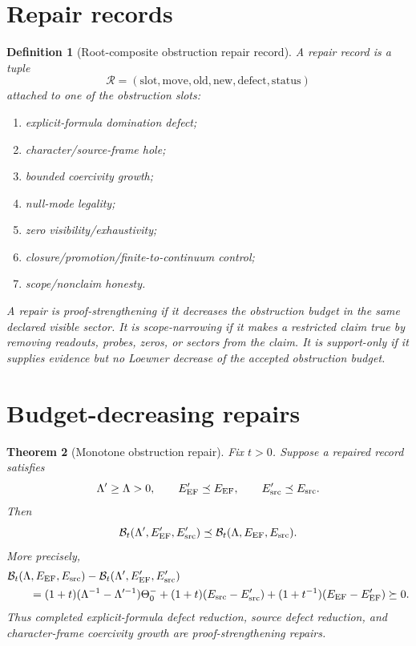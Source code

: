 \documentclass[11pt]{article}
\newtheorem{theorem}{Theorem}[section]
\newtheorem{definition}[theorem]{Definition}
\newcommand{\ThetaZero}{\Theta^-_0}
\newcommand{\EEF}{E_{\rm EF}}
\newcommand{\Esrc}{E_{\rm src}}
\newcommand{\Loewner}{\preceq}
\begin{document}
\section{Repair records}

\begin{definition}[Root-composite obstruction repair record]
A repair record is a tuple
\[
  \mathcal R=(\mathrm{slot},\mathrm{move},\mathrm{old},\mathrm{new},\mathrm{defect},\mathrm{status})
\]
attached to one of the obstruction slots:
\begin{enumerate}[label=(\roman*)]
\item explicit-formula domination defect;
\item character/source-frame hole;
\item bounded coercivity growth;
\item null-mode legality;
\item zero visibility/exhaustivity;
\item closure/promotion/finite-to-continuum control;
\item scope/nonclaim honesty.
\end{enumerate}
A repair is \emph{proof-strengthening} if it decreases the obstruction budget in the same declared visible sector.  It is \emph{scope-narrowing} if it makes a restricted claim true by removing readouts, probes, zeros, or sectors from the claim.  It is \emph{support-only} if it supplies evidence but no Loewner decrease of the accepted obstruction budget.
\end{definition}

\section{Budget-decreasing repairs}

\begin{theorem}[Monotone obstruction repair]
Fix $t>0$.  Suppose a repaired record satisfies
\[
  \Lambda'\ge \Lambda>0,
  \qquad
  \EEF'\Loewner \EEF,
  \qquad
  \Esrc'\Loewner \Esrc.
\]
Then
\[
  \mathcal B_t(\Lambda',\EEF',\Esrc')
  \Loewner
  \mathcal B_t(\Lambda,\EEF,\Esrc).
\]
More precisely,
\begin{align}
&\mathcal B_t(\Lambda,\EEF,\Esrc)-\mathcal B_t(\Lambda',\EEF',\Esrc') \\
&\qquad =(1+t)(\Lambda^{-1}-\Lambda'^{-1})\ThetaZero
 +(1+t)(\Esrc-\Esrc')+(1+t^{-1})(\EEF-\EEF')\succeq 0.
\end{align}
Thus completed explicit-formula defect reduction, source defect reduction, and character-frame coercivity growth are proof-strengthening repairs.
\end{theorem}
\end{document}
